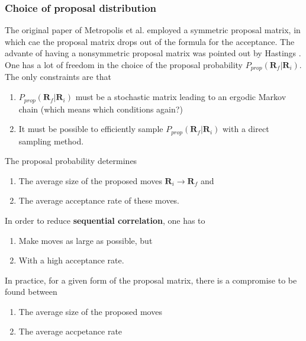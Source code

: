 \documentclass[twoside,english]{uiofysmaster}
\begin{document}
\subsubsection{Choice of proposal distribution}
The original paper of Metropolis et al. \cite{Metropolis1953} employed a symmetric proposal matrix, in which cae the proposal matrix drops out of the formula for the acceptance. The advante of having a nonsymmetric proposal matrix was pointed out by Hastings \cite{Hastings1970}. One has a lot of freedom in the choice of the proposal probability $P_{prop} (\bm{R}_f | \bm{R}_i)$. The only constraints are that
\begin{enumerate}
	\item $P_{prop} (\bm{R}_f | \bm{R}_i)$ must be a stochastic matrix leading to an ergodic Markov chain (which means which conditions again?)
	\item It must be possible to efficiently sample $P_{prop} (\bm{R}_f | \bm{R}_i)$ with a direct sampling method.
\end{enumerate}
The proposal probability determines 
\begin{enumerate}
	\item The average size of the proposed moves $\bm{R}_i \rightarrow \bm{R}_f$ and 
	\item The average acceptance rate of these moves.
\end{enumerate}
In order to reduce \textbf{sequential correlation}, one has to 
\begin{enumerate}
	\item Make moves as large as possible, but 
	\item With a high acceptance rate.
\end{enumerate}
In practice, for a given form of the proposal matrix, there is a compromise to be found between
\begin{enumerate}
	\item The average size of the proposed moves
	\item The average accpetance rate
\end{enumerate}
\cite{Toulouse2016}
\end{document}
